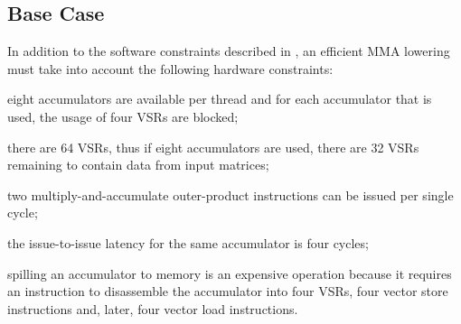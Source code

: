 \documentclass[\main/thesis.tex]{subfiles}
\begin{document}
\subsection{Base Case}
\label{sec:baseCase}
In addition to the software constraints described in , an efficient MMA lowering must take into account the following hardware constraints:
\begin{enumerate*}[itemjoin*={{ and }}, label=\fbox{\arabic*}]
  \item eight accumulators are available per thread and for each accumulator that is used, the usage of four VSRs are blocked;
  \item there are 64 VSRs, thus if eight accumulators are used, there are 32 VSRs remaining to contain data from input matrices;
  \item two multiply-and-accumulate outer-product instructions can be issued per single cycle;
  \item the issue-to-issue latency for the same accumulator is four cycles;
  \item spilling an accumulator to memory is an expensive operation because it requires an instruction to disassemble the accumulator into four VSRs, four vector store instructions and, later, four vector load instructions.
\end{enumerate*}
\end{document}
